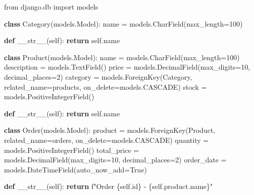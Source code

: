 \documentclass[
  a4paper,
  DIV=11,
  numbers=noendperiod,
  onepage,
  openany]{scrreprt}
\newenvironment{Shaded}{\begin{snugshade}}{\end{snugshade}}
\newcommand{\BuiltInTok}[1]{\textcolor[rgb]{0.00,0.23,0.31}{#1}}
\newcommand{\ControlFlowTok}[1]{\textcolor[rgb]{0.00,0.23,0.31}{\textbf{#1}}}
\newcommand{\DecValTok}[1]{\textcolor[rgb]{0.68,0.00,0.00}{#1}}
\newcommand{\FunctionTok}[1]{\textcolor[rgb]{0.28,0.35,0.67}{#1}}
\newcommand{\ImportTok}[1]{\textcolor[rgb]{0.00,0.46,0.62}{#1}}
\newcommand{\KeywordTok}[1]{\textcolor[rgb]{0.00,0.23,0.31}{\textbf{#1}}}
\newcommand{\NormalTok}[1]{\textcolor[rgb]{0.00,0.23,0.31}{#1}}
\newcommand{\OperatorTok}[1]{\textcolor[rgb]{0.37,0.37,0.37}{#1}}
\newcommand{\SpecialCharTok}[1]{\textcolor[rgb]{0.37,0.37,0.37}{#1}}
\newcommand{\SpecialStringTok}[1]{\textcolor[rgb]{0.13,0.47,0.30}{#1}}
\newcommand{\StringTok}[1]{\textcolor[rgb]{0.13,0.47,0.30}{#1}}
\newcommand{\VariableTok}[1]{\textcolor[rgb]{0.07,0.07,0.07}{#1}}
\begin{document}
\begin{Shaded}
\begin{Highlighting}[]
\ImportTok{from}\NormalTok{ django.db }\ImportTok{import}\NormalTok{ models}

\KeywordTok{class}\NormalTok{ Category(models.Model):}
\NormalTok{    name }\OperatorTok{=}\NormalTok{ models.CharField(max\_length}\OperatorTok{=}\DecValTok{100}\NormalTok{)}

    \KeywordTok{def} \FunctionTok{\_\_str\_\_}\NormalTok{(}\VariableTok{self}\NormalTok{):}
        \ControlFlowTok{return} \VariableTok{self}\NormalTok{.name}

\KeywordTok{class}\NormalTok{ Product(models.Model):}
\NormalTok{    name }\OperatorTok{=}\NormalTok{ models.CharField(max\_length}\OperatorTok{=}\DecValTok{100}\NormalTok{)}
\NormalTok{    description }\OperatorTok{=}\NormalTok{ models.TextField()}
\NormalTok{    price }\OperatorTok{=}\NormalTok{ models.DecimalField(max\_digits}\OperatorTok{=}\DecValTok{10}\NormalTok{, decimal\_places}\OperatorTok{=}\DecValTok{2}\NormalTok{)}
\NormalTok{    category }\OperatorTok{=}\NormalTok{ models.ForeignKey(Category, related\_name}\OperatorTok{=}\StringTok{\textquotesingle{}products\textquotesingle{}}\NormalTok{, on\_delete}\OperatorTok{=}\NormalTok{models.CASCADE)}
\NormalTok{    stock }\OperatorTok{=}\NormalTok{ models.PositiveIntegerField()}

    \KeywordTok{def} \FunctionTok{\_\_str\_\_}\NormalTok{(}\VariableTok{self}\NormalTok{):}
        \ControlFlowTok{return} \VariableTok{self}\NormalTok{.name}

\KeywordTok{class}\NormalTok{ Order(models.Model):}
\NormalTok{    product }\OperatorTok{=}\NormalTok{ models.ForeignKey(Product, related\_name}\OperatorTok{=}\StringTok{\textquotesingle{}orders\textquotesingle{}}\NormalTok{, on\_delete}\OperatorTok{=}\NormalTok{models.CASCADE)}
\NormalTok{    quantity }\OperatorTok{=}\NormalTok{ models.PositiveIntegerField()}
\NormalTok{    total\_price }\OperatorTok{=}\NormalTok{ models.DecimalField(max\_digits}\OperatorTok{=}\DecValTok{10}\NormalTok{, decimal\_places}\OperatorTok{=}\DecValTok{2}\NormalTok{)}
\NormalTok{    order\_date }\OperatorTok{=}\NormalTok{ models.DateTimeField(auto\_now\_add}\OperatorTok{=}\VariableTok{True}\NormalTok{)}

    \KeywordTok{def} \FunctionTok{\_\_str\_\_}\NormalTok{(}\VariableTok{self}\NormalTok{):}
        \ControlFlowTok{return} \SpecialStringTok{f"Order }\SpecialCharTok{\{}\VariableTok{self}\SpecialCharTok{.}\BuiltInTok{id}\SpecialCharTok{\}}\SpecialStringTok{ {-} }\SpecialCharTok{\{}\VariableTok{self}\SpecialCharTok{.}\NormalTok{product}\SpecialCharTok{.}\NormalTok{name}\SpecialCharTok{\}}\SpecialStringTok{"}
\end{Highlighting}
\end{Shaded}
\end{document}
